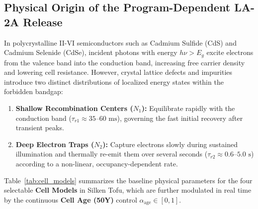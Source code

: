 \documentclass[11pt,a4paper]{article}
\begin{document}
\subsection{Physical Origin of the Program-Dependent LA-2A Release}

In polycrystalline II-VI semiconductors such as Cadmium Sulfide (CdS) and Cadmium Selenide (CdSe), incident photons with energy $h\nu > E_g$ excite electrons from the valence band into the conduction band, increasing free carrier density and lowering cell resistance. However, crystal lattice defects and impurities introduce two distinct distributions of localized energy states within the forbidden bandgap:
\begin{enumerate}
    \item \textbf{Shallow Recombination Centers ($N_1$):} Equilibrate rapidly with the conduction band ($\tau_{r1} \approx 35\text{--}60\text{ ms}$), governing the fast initial recovery after transient peaks.
    \item \textbf{Deep Electron Traps ($N_2$):} Capture electrons slowly during sustained illumination and thermally re-emit them over several seconds ($\tau_{r2} \approx 0.6\text{--}5.0\text{ s}$) according to a non-linear, occupancy-dependent rate.
\end{enumerate}

Table~\ref{tab:cell_models} summarizes the baseline physical parameters for the four selectable \textbf{Cell Models} in Silken Tofu, which are further modulated in real time by the continuous \textbf{Cell Age (50Y)} control $\alpha_{\text{age}} \in [0, 1]$.

\begin{table}[H]
\centering
\caption{Baseline Semiconductor Parameters Across Selectable T4-Bean Photoconductor Models}
\label{tab:cell_models}
\vspace{0.3em}
\end{table}
\end{document}
